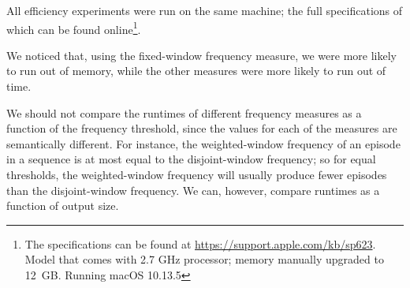 All efficiency experiments were run on the same machine; the full specifications of which can be found online\footnote{The specifications can be found at \url{https://support.apple.com/kb/sp623}. Model that comes with 2.7 GHz processor; memory manually upgraded to 12~GB. Running macOS 10.13.5}.

We noticed that, using the fixed-window frequency measure, we were more likely to run out of memory, while the other measures were more likely to run out of time.

We should not compare the runtimes of different frequency measures as a function of the frequency threshold, since the values for each of the measures are semantically different. For instance, the weighted-window frequency of an episode in a sequence is at most equal to the disjoint-window frequency; so for equal thresholds, the weighted-window frequency will usually produce fewer episodes than the disjoint-window frequency. We can, however, compare runtimes as a function of output size.

